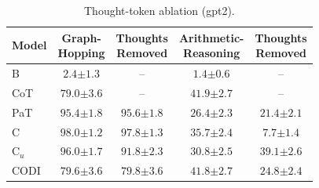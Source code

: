 \begin{table}[!t]
\centering
\small
\setlength{\tabcolsep}{3pt}
\begin{tabular}{lcc|cc}
\toprule
Model & \makecell{Graph- \\ Hopping} & \makecell{Thoughts \\ Removed} & \makecell{Arithmetic- \\ Reasoning} & \makecell{Thoughts \\ Removed} \\
\midrule
B & $2.4 {\scriptstyle \pm 1.3}$ & -- & $1.4 {\scriptstyle \pm 0.6}$ & -- \\
CoT & $79.0 {\scriptstyle \pm 3.6}$ & -- & $41.9 {\scriptstyle \pm 2.7}$ & -- \\
PaT & $95.4 {\scriptstyle \pm 1.8}$ & $95.6 {\scriptstyle \pm 1.8}$ & $26.4 {\scriptstyle \pm 2.3}$ & $21.4 {\scriptstyle \pm 2.1}$ \\
C & $98.0 {\scriptstyle \pm 1.2}$ & $97.8 {\scriptstyle \pm 1.3}$ & $35.7 {\scriptstyle \pm 2.4}$ & $7.7 {\scriptstyle \pm 1.4}$ \\
C$_u$ & $96.0 {\scriptstyle \pm 1.7}$ & $91.8 {\scriptstyle \pm 2.3}$ & $30.8 {\scriptstyle \pm 2.5}$ & $39.1 {\scriptstyle \pm 2.6}$ \\
CODI & $79.6 {\scriptstyle \pm 3.6}$ & $79.8 {\scriptstyle \pm 3.6}$ & $41.8 {\scriptstyle \pm 2.7}$ & $24.8 {\scriptstyle \pm 2.4}$ \\
\bottomrule
\end{tabular}
\caption{Thought-token ablation (gpt2).}
\label{tab:ablation_main_gpt2}
\end{table}